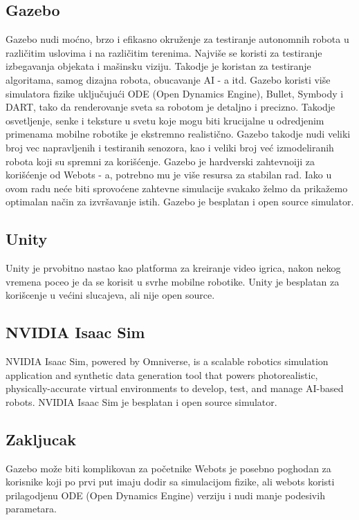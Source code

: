 \subsection{Gazebo}
Gazebo nudi moćno, brzo i efikasno okruženje za testiranje autonomnih robota u različitim
uslovima i na različitim terenima. Najviše se koristi za testiranje izbegavanja objekata 
i mašinsku viziju. Takodje je koristan za testiranje algoritama,
samog dizajna robota, obucavanje AI - a itd.
Gazebo koristi više simulatora fizike uključujući ODE (Open Dynamics
Engine), Bullet, Symbody i DART,
tako da renderovanje sveta sa robotom je detaljno i precizno.
Takodje osvetljenje, senke i teksture u svetu koje mogu biti krucijalne u odredjenim primenama
mobilne robotike je ekstremno realistično.
Gazebo takodje nudi veliki broj vec napravljenih i testiranih senozora, kao i
veliki broj već izmodeliranih robota koji su spremni za korišćenje.\cite{gazebo}
\newline
Gazebo je hardverski zahtevnoiji za korišćenje od Webots - a, potrebno mu je više resursa
za stabilan rad\cite{webots-vs-gazebo}\cite{webots-vs-gazebo-2}. Iako u ovom radu neće biti sprovoćene zahtevne simulacije
svakako želmo da prikažemo optimalan način za izvršavanje istih. 
\newline
\newline
Gazebo je besplatan i open source simulator.
\subsection{Unity}
Unity je prvobitno nastao kao platforma za kreiranje video igrica, nakon nekog vremena
poceo je da se korisit u svrhe mobilne robotike. 
\newline
\newline
Unity je besplatan za korišcenje u većini slucajeva, ali nije open source. 


\subsection{NVIDIA Isaac Sim}
NVIDIA Isaac Sim, powered by Omniverse, is a scalable robotics simulation
application and synthetic data generation tool that powers photorealistic,
physically-accurate virtual environments to develop, test,
and manage AI-based robots.
\newline
\newline
NVIDIA Isaac Sim je besplatan i open source simulator.

\subsection{Zakljucak}
Gazebo može biti komplikovan za početnike
Webots je posebno poghodan za korisnike koji po prvi put imaju dodir sa simulacijom 
fizike, ali webots koristi prilagodjenu ODE (Open Dynamics Engine)
verziju i nudi manje podesivih
parametara\cite{webots-vs-gazebo-2}.